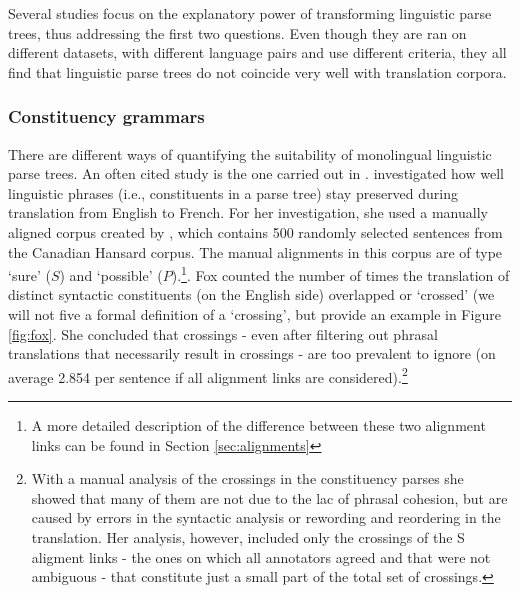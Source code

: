 \documentclass{report}
\theoremstyle{break}
\begin{document}
Several studies focus on the explanatory power of transforming linguistic parse trees, thus addressing the first two questions. Even though they are ran on different datasets, with different language pairs and use different criteria, they all find that linguistic parse trees do not coincide very well with translation corpora.

\subsubsection{Constituency grammars}

There are different ways of quantifying the suitability of monolingual linguistic parse trees. An often cited study is the one carried out in \cite{fox2002phrasal}. \citeauthor{fox2002phrasal} investigated how well linguistic phrases (i.e., constituents in a parse tree) stay preserved during translation from English to French. For her investigation, she used a manually aligned corpus created by \cite{och2000improved}, which contains 500 randomly selected sentences from the Canadian Hansard corpus. The manual alignments in this corpus are of type `sure' ($S$) and `possible' ($P$).\footnote{A more detailed description of the difference between these two alignment links can be found in Section \ref{sec:alignments}}. Fox counted the number of times the translation of distinct syntactic constituents (on the English side) overlapped or `crossed' (we will not five a formal definition of a `crossing', but provide an example in Figure \ref{fig:fox}. She concluded that crossings - even after filtering out phrasal translations that necessarily result in crossings - are too prevalent to ignore (on average 2.854 per sentence if all alignment links are considered).\footnote{With a manual analysis of the crossings in the constituency parses she showed that many of them are not due to the lac of phrasal cohesion, but are caused by errors in the syntactic analysis or rewording and reordering in the translation. Her analysis, however, included only the crossings of the S aligment links - the ones on which all annotators agreed and that were not ambiguous - that constitute just a small part of the total set of crossings.}
\end{document}
